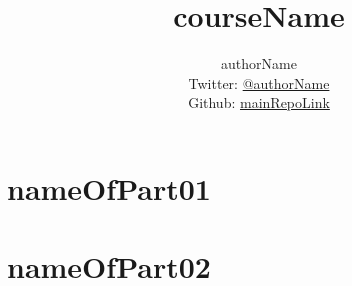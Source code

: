 
\title{\Huge\textbf{courseName}}
\author{
  authorName \\
  \small Twitter: \href{telegramLink}{@authorName} \\[3pt]
\small Github: \href{mainRepoLink}{mainRepoLink}}


\maketitle
\tableofcontents

  
  \part{nameOfPart01}

    

  \part{nameOfPart02}

    
  

